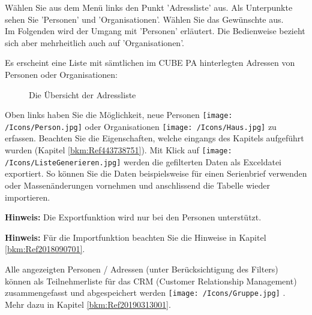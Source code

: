 Wählen Sie aus dem Menü links den Punkt 'Adressliste' aus. Als Unterpunkte sehen Sie 'Personen' und 'Organisationen'. Wählen Sie das Gewünschte aus.\\
Im Folgenden wird der Umgang mit 'Personen' erläutert. Die Bedienweise bezieht sich aber mehrheitlich auch auf 'Organisationen'.

\vspace{4cm}

Es erscheint eine Liste mit sämtlichen im CUBE PA hinterlegten Adressen von Personen oder Organisationen:

\begin{figure}[H]
\caption{Die Übersicht der Adressliste}
\end{figure}

Oben links haben Sie die Möglichkeit, neue Personen \texttt{[image: /Icons/Person.jpg]}  oder Organisationen \texttt{[image: /Icons/Haus.jpg]}  zu erfassen. Beachten Sie die Eigenschaften, welche eingangs des Kapitels aufgeführt wurden (Kapitel \ref{bkm:Ref443738751}). \newline
Mit Klick auf \texttt{[image: /Icons/ListeGenerieren.jpg]}  werden die gefilterten Daten als Exceldatei exportiert. So können Sie die Daten beispielsweise für einen Serienbrief verwenden oder Massenänderungen vornehmen und anschlissend die Tabelle wieder importieren. 

\vspace{\baselineskip}

\textbf{Hinweis:} Die Exportfunktion wird nur bei den Personen unterstützt.

\textbf{Hinweis:} Für die Importfunktion beachten Sie die Hinweise in Kapitel \ref{bkm:Ref2018090701}.

\vspace{\baselineskip}

Alle angezeigten Personen / Adressen (unter Berücksichtigung des Filters) können als Teilnehmerliste  für das CRM (Customer Relationship Management) zusammengefasst und abgespeichert werden \texttt{[image: /Icons/Gruppe.jpg]} . Mehr dazu in Kapitel \ref{bkm:Ref20190313001}.

